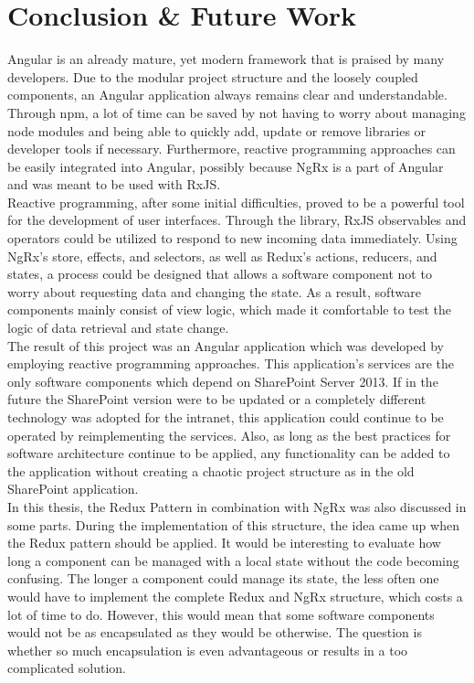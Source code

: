 \documentclass[Bachelor,BIF,english]{twbook}
\begin{document}
\chapter{Conclusion \& Future Work}
Angular is an already mature, yet modern framework that is praised by many developers. Due to the modular project structure and the loosely coupled components, an Angular application always remains clear and understandable. Through npm, a lot of time can be saved by not having to worry about managing node modules and being able to quickly add, update or remove libraries or developer tools if necessary.  Furthermore, reactive programming approaches can be easily integrated into Angular, possibly because NgRx is a part of Angular and was meant to be used with RxJS. 
\\[\baselineskip]
Reactive programming, after some initial difficulties, proved to be a powerful tool for the development of user interfaces. Through the library, RxJS observables and operators could be utilized to respond to new incoming data immediately. Using NgRx's store, effects, and selectors, as well as Redux's actions, reducers, and states, a process could be designed that allows a software component not to worry about requesting data and changing the state. As a result, software components mainly consist of view logic, which made it comfortable to test the logic of data retrieval and state change.
\\[\baselineskip]
The result of this project was an Angular application which was developed by employing reactive programming approaches. This application's services are the only software components which depend on SharePoint Server 2013. If in the future the SharePoint version were to be updated or a completely different technology was adopted for the intranet, this application could continue to be operated by reimplementing the services. Also, as long as the best practices for software architecture continue to be applied, any functionality can be added to the application without creating a chaotic project structure as in the old SharePoint application.
\\[\baselineskip]
In this thesis, the Redux Pattern in combination with NgRx was also discussed in some parts. During the implementation of this structure, the idea came up when the Redux pattern should be applied. It would be interesting to evaluate how long a component can be managed with a local state without the code becoming confusing. The longer a component could manage its state, the less often one would have to implement the complete Redux and NgRx structure, which costs a lot of time to do. However, this would mean that some software components would not be as encapsulated as they would be otherwise. The question is whether so much encapsulation is even advantageous or results in a too complicated solution.
\end{document}
